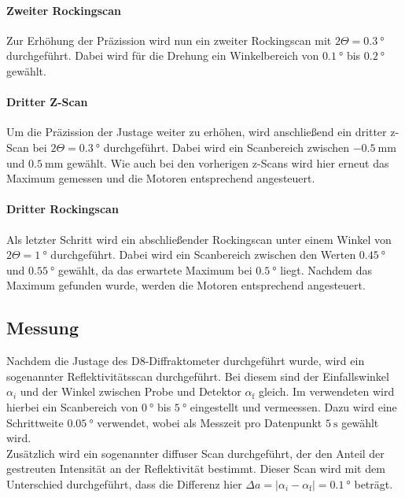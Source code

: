 \paragraph{Zweiter Rockingscan}
Zur Erhöhung der Präzission wird nun ein zweiter Rockingscan mit $2\Theta = \SI{0.3}{\degree}$ durchgeführt. Dabei wird für die Drehung ein Winkelbereich
von $\SI{0.1}{\degree}$ bis $\SI{0.2}{\degree}$ gewählt.


\paragraph{Dritter Z-Scan}
Um die Präzission der Justage weiter zu erhöhen, wird anschließend ein dritter z-Scan bei $2\Theta = \SI{0.3}{\degree}$ durchgeführt. Dabei wird ein Scanbereich zwischen $\SI{-0.5}{\milli\meter}$ und $ \SI{0.5}{\milli\meter}$ gewählt. Wie auch bei den vorherigen z-Scans wird hier erneut das Maximum gemessen und die Motoren entsprechend angesteuert.

\paragraph{Dritter Rockingscan}
Als letzter Schritt wird ein abschließender Rockingscan unter einem Winkel von $2\Theta = \SI{1}{\degree}$ durchgeführt. 
Dabei wird ein Scanbereich zwischen den Werten $\SI{0.45}{\degree}$ und $\SI{0.55}{\degree}$ gewählt, da das erwartete Maximum bei $\SI{0.5}{\degree}$ liegt.
Nachdem das Maximum gefunden wurde, werden die Motoren entsprechend angesteuert. 



\subsection{Messung}
\label{subsec:messung}
Nachdem die Justage des D8-Diffraktometer durchgeführt wurde, wird ein sogenannter Reflektivitätsscan durchgeführt. Bei diesem sind der Einfallswinkel $\alpha_i$ und der Winkel zwischen Probe und Detektor $\alpha_{\text{f}}$ gleich. Im verwendeten wird hierbei ein Scanbereich von $\SI{0}{\degree}$ bis
$\SI{5}{\degree}$ eingestellt und vermeessen. Dazu wird eine Schrittweite $\SI{0.05}{\degree}$ verwendet, wobei als Messzeit pro Datenpunkt $\SI{5}{\second}$ gewählt wird. \\
Zusätzlich wird ein sogenannter diffuser Scan durchgeführt, der den Anteil der gestreuten Intensität an der Reflektivität bestimmt. Dieser Scan wird mit dem Unterschied durchgeführt, dass die Differenz hier $\Delta a = | \alpha_i - \alpha_{\text{f}} | =  \SI{0,1}{\degree} $ beträgt.
